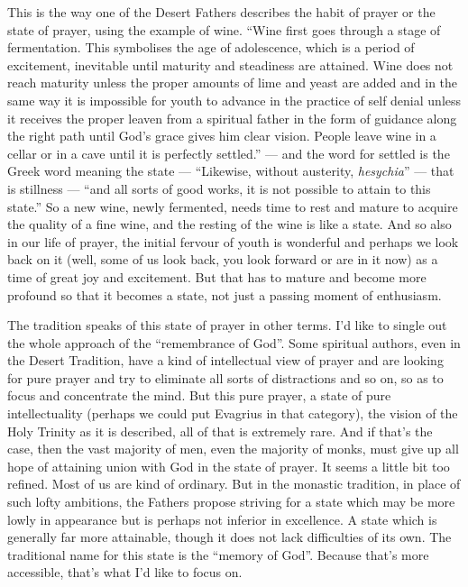 This is the way one of the Desert Fathers describes the habit of prayer or the state of prayer, using the example of wine. ``Wine first goes through a stage of fermentation. This symbolises the age of adolescence, which is a period of excitement, inevitable until maturity and steadiness are attained. Wine does not reach maturity unless the proper amounts of lime and yeast are added and in the same way it is impossible for youth to advance in the practice of self denial unless it receives the proper leaven from a spiritual father in the form of guidance along the right path until God's grace gives him clear vision. People leave wine in a cellar or in a cave until it is perfectly settled.'' --- and the word for settled is the Greek word meaning the state --- ``Likewise, without austerity, \emph{hesychia}'' --- that is stillness --- ``and all sorts of good works, it is not possible to attain to this state.'' So a new wine, newly fermented, needs time to rest and mature to acquire the quality of a fine wine, and the resting of the wine is like a state. And so also in our life of prayer, the initial fervour of youth is wonderful and perhaps we look back on it (well, some of us look back, you look forward or are in it now) as a time of great joy and excitement. But that has to mature and become more profound so that it becomes a state, not just a passing moment of enthusiasm.

The tradition speaks of this state of prayer in other terms. I'd like to single out the whole approach of the ``remembrance of God''. Some spiritual authors, even in the Desert Tradition, have a kind of intellectual view of prayer and are looking for pure prayer and try to eliminate all sorts of distractions and so on, so as to focus and concentrate the mind. But this pure prayer, a state of pure intellectuality (perhaps we could put Evagrius in that category), the vision of the Holy Trinity as it is described, all of that is extremely rare. And if that's the case, then the vast majority of men, even the majority of monks, must give up all hope of attaining union with God in the state of prayer. It seems a little bit too refined. Most of us are kind of ordinary. But in the monastic tradition, in place of such lofty ambitions, the Fathers propose striving for a state which may be more lowly in appearance but is perhaps not inferior in excellence. A state which is generally far more attainable, though it does not lack difficulties of its own. The traditional name for this state is the ``memory of God''. Because that's more accessible, that's what I'd like to focus on.

